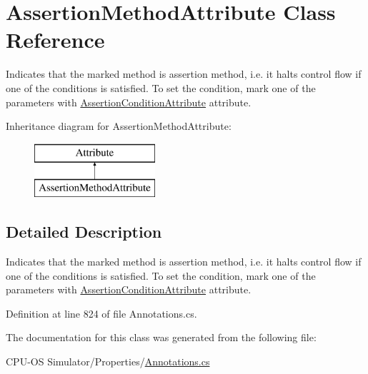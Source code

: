 \hypertarget{class_assertion_method_attribute}{}\section{Assertion\+Method\+Attribute Class Reference}
\label{class_assertion_method_attribute}


Indicates that the marked method is assertion method, i.\+e. it halts control flow if one of the conditions is satisfied. To set the condition, mark one of the parameters with \hyperlink{class_assertion_condition_attribute}{Assertion\+Condition\+Attribute} attribute.  


Inheritance diagram for Assertion\+Method\+Attribute\+:\begin{figure}[H]
\begin{center}
\leavevmode
\includegraphics[height=2.000000cm]{class_assertion_method_attribute}
\end{center}
\end{figure}


\subsection{Detailed Description}
Indicates that the marked method is assertion method, i.\+e. it halts control flow if one of the conditions is satisfied. To set the condition, mark one of the parameters with \hyperlink{class_assertion_condition_attribute}{Assertion\+Condition\+Attribute} attribute. 



Definition at line 824 of file Annotations.\+cs.



The documentation for this class was generated from the following file\+:\begin{DoxyCompactItemize}
\item 
C\+P\+U-\/\+O\+S Simulator/\+Properties/\hyperlink{_annotations_8cs}{Annotations.\+cs}\end{DoxyCompactItemize}

